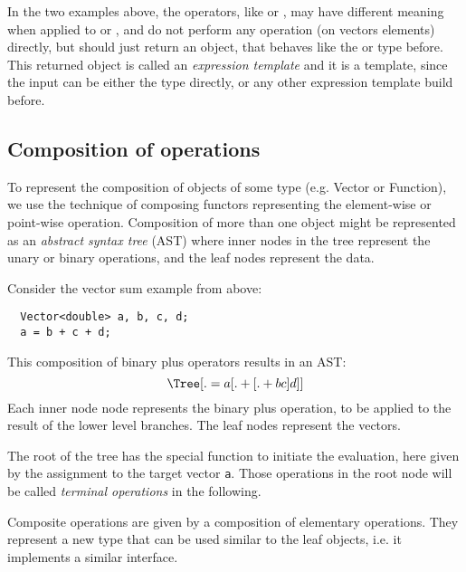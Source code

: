 In the two examples above, the operators, like  or , may have different meaning when applied to  or ,
and do not perform any operation (on vectors elements) directly, but should just return an object, that behaves like the  or  type
before. This returned object is called an \emph{expression template} and it is a template, since the input can be either the  type directly, or
any other expression template build before.


\subsection{Composition of operations}
To represent the composition of objects of some type (e.g. Vector or Function), we use the technique of composing functors representing the
element-wise or point-wise operation. Composition of more than one object might be represented as an \emph{abstract syntax tree} (AST) where
inner nodes in the tree represent the unary or binary operations, and the leaf nodes represent the data.

\begin{example}
  Consider the vector sum example from above:
  \begin{verbatim}
  Vector<double> a, b, c, d;
  a = b + c + d;
  \end{verbatim}
  This composition of binary plus operators results in an AST:
  \begin{equation}
  \Tree [.= a [.+ [.+ b c ] d ] ]
  \end{equation}
  Each inner node node represents the binary plus operation, to be applied to the result of the lower level branches. The leaf nodes represent the vectors.

  The root of the tree has the special function to initiate the evaluation, here given by the assignment to the target vector \texttt{a}.
  Those operations in the root node will be called \emph{terminal operations} in the following.
\end{example}

Composite operations are given by a composition of elementary operations. They represent a new type that can be used similar to the leaf objects, i.e.
it implements a similar interface.

